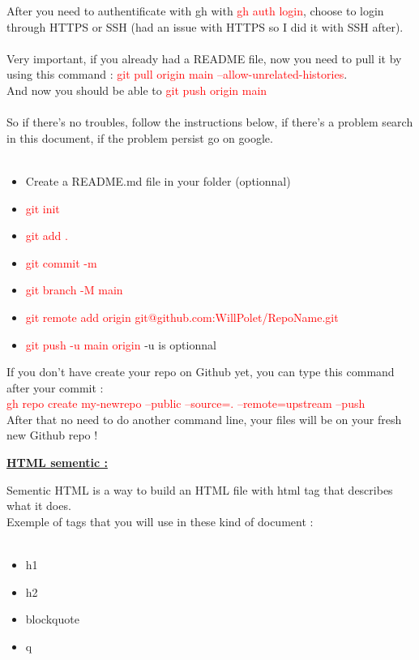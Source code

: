 \documentclass{article}
\begin{document}
After you need to authentificate with gh with \textcolor{red}{gh auth login}, choose to login through HTTPS or SSH (had an issue with HTTPS so I did it with SSH after). \\ \\
Very important, if you already had a README file, now you need to pull it by using this command : \textcolor{red}{git pull origin main --allow-unrelated-histories}. \\
And now you should be able to \textcolor{red}{git push origin main} \\ \\
So if there's no troubles, follow the instructions below, if there's a problem search in this document, if the problem persist go on google. \\ \\
\begin{itemize}
    \item Create a README.md file in your folder (optionnal)
    \item \textcolor{red}{git init}
    \item \textcolor{red}{git add .}
    \item \textcolor{red}{git commit -m}
    \item \textcolor{red}{git branch -M main}
    \item \textcolor{red}{git remote add origin git@github.com:WillPolet/RepoName.git}
    \item \textcolor{red}{git push -u main origin} -u is optionnal
\end{itemize}
\vspace{0.3cm}
If you don't have create your repo on Github yet, you can type this command after your commit : \\
\textcolor{red}{gh repo create my-newrepo --public --source=. --remote=upstream --push} \\
After that no need to do another command line, your files will be on your fresh new Github repo !
\newpage
\begin{center}
    \LARGE{\bf \underline {HTML sementic :}} \\
\end{center}
Sementic HTML is a way to build an HTML file with html tag that describes what it does. \\
Exemple of tags that you will use in these kind of document : \\ \\
\begin{minipage}[c]{0.25\textwidth}
    \begin{itemize}[label = $\bullet$]
        \item h1
        \item h2
        \item blockquote
        \item q
    \end{itemize}
\end{minipage}
\end{document}
